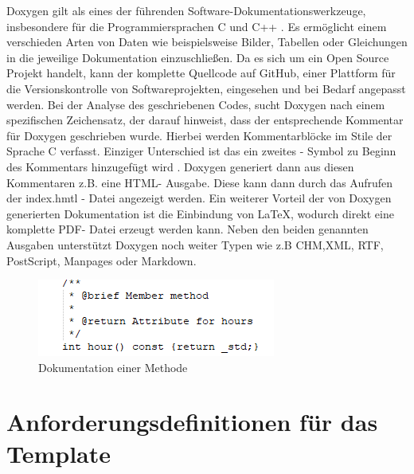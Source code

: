 \documentclass[11pt,a4paper]{report}
\begin{document}
Doxygen gilt als eines der führenden Software-Dokumentationswerkzeuge, insbesondere für die Programmiersprachen C und C++ \cite{Beningo}. Es ermöglicht einem verschieden Arten von Daten wie beispielsweise Bilder, Tabellen oder Gleichungen in die jeweilige Dokumentation einzuschließen. Da es sich um ein Open Source Projekt handelt, kann der komplette Quellcode auf GitHub, einer Plattform für die Versionskontrolle von Softwareprojekten, eingesehen und bei Bedarf angepasst werden\cite{doxygen_git}. Bei der Analyse des geschriebenen Codes, sucht Doxygen nach einem spezifischen Zeichensatz, der darauf hinweist, dass der entsprechende Kommentar für Doxygen geschrieben wurde. Hierbei werden Kommentarblöcke im Stile der Sprache C verfasst. Einziger Unterschied ist das ein zweites \glqq  *  \grqq{}- Symbol zu Beginn des Kommentars hinzugefügt wird \cite{Beningo}. Doxygen generiert dann aus diesen Kommentaren z.B. eine HTML- Ausgabe. Diese kann dann durch das Aufrufen der \glqq index.hmtl \grqq{}- Datei angezeigt werden. Ein weiterer Vorteil der von Doxygen generierten Dokumentation ist die Einbindung von LaTeX, wodurch direkt eine komplette PDF- Datei erzeugt werden kann. Neben den beiden genannten Ausgaben unterstützt Doxygen noch weiter Typen wie z.B  CHM,XML, RTF, PostScript, Manpages oder Markdown\cite{doxygen}.
 \begin{figure}[h]
    \centering
    \includegraphics{images/Doxygen_Example.png}
    \caption{Dokumentation einer Methode}
    \label{fig:doxygen-example}
\end{figure}



\section{Anforderungsdefinitionen für das Template} \label{sec:Requirments}
\end{document}
